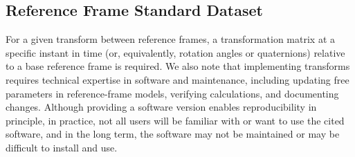 \documentclass[draft]{agujournal2019}
\begin{document}







\subsection{Reference Frame Standard Dataset}
\label{sect:reference-dataset}

For a given transform between reference frames, a transformation matrix at a specific instant in time (or, equivalently, rotation angles or quaternions) relative to a base reference frame is required. We also note that implementing transforms requires technical expertise in software and maintenance, including updating free parameters in reference-frame models, verifying calculations, and documenting changes. Although providing a software version enables reproducibility in principle, in practice, not all users will be familiar with or want to use the cited software, and in the long term, the software may not be maintained or may be difficult to install and use. 
\end{document}
